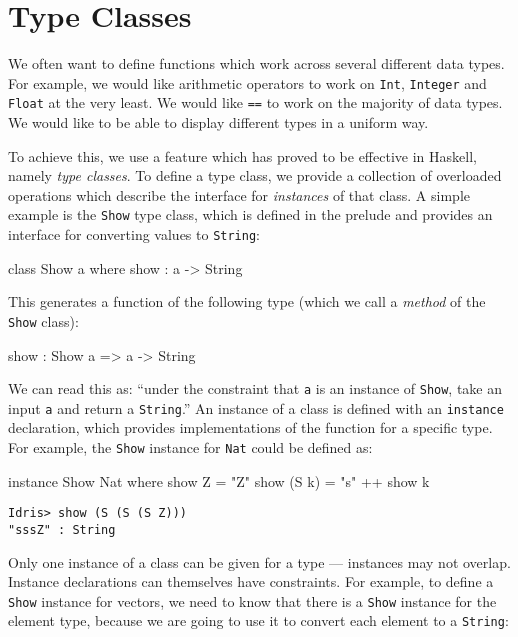 \section{Type Classes}
\label{sec:classes}

We often want to define functions which work across several different data types.
For example, we would like arithmetic operators to work on \texttt{Int}, \texttt{Integer} and \texttt{Float} at the very least.
We would like \texttt{==} to work on the majority of data types.
We would like to be able to display different types in a uniform way.

To achieve this, we use a feature which has proved to be effective in Haskell, namely \emph{type classes}.
To define a type class, we provide a collection of overloaded operations which describe the interface for \emph{instances} of that class.
A simple example is the \texttt{Show} type class, which is defined in the prelude and provides an interface for converting values to \texttt{String}:

\begin{code}
class Show a where
    show : a -> String
\end{code}

\noindent
This generates a function of the following type (which we call a \emph{method} of the  \texttt{Show} class):

\begin{code}
show : Show a => a -> String
\end{code}

\noindent
We can read this as: ``under the constraint that \texttt{a} is an instance of \texttt{Show}, take an input \texttt{a} and return a \texttt{String}.''
An instance of a class is defined with an \texttt{instance} declaration, which provides implementations of the function for a specific type.
For example, the \texttt{Show} instance for \texttt{Nat} could be defined as:

\begin{code}
instance Show Nat where
    show Z = "Z"
    show (S k) = "s" ++ show k
\end{code}

\begin{lstlisting}
Idris> show (S (S (S Z)))
"sssZ" : String
\end{lstlisting}

\noindent
Only one instance of a class can be given for a type --- instances may not overlap.
Instance declarations can themselves have constraints.
For example, to define a \texttt{Show} instance for vectors, we need to know that there is a \texttt{Show}  instance for the element type, because we are going to use it to convert each element to a \texttt{String}:

